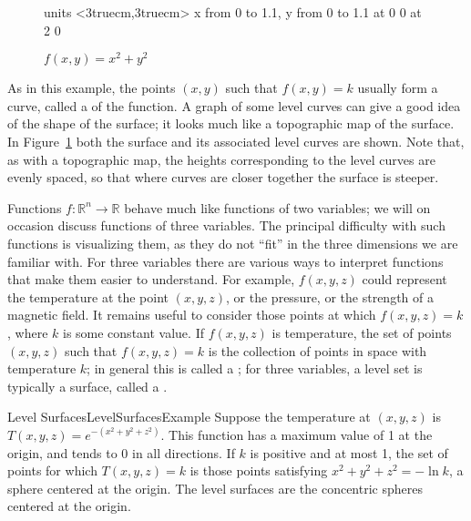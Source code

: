 \begin{figure}[H]
\centerline{
\vbox{\beginpicture
\normalgraphs
\setcoordinatesystem units <3truecm,3truecm>
\setplotarea x from 0 to 1.1, y from 0 to 1.1
 at 0 0
 at 2 0
\endpicture}}
\caption{$f(x,y)=x^2 + y^2$}
\label{fig:parabolic bowl}
\end{figure}

As in this example, the points $(x,y)$ such that $f(x,y)=k$ usually
form a curve, called a  of the
function. A graph of some level curves can give a good idea of the
shape of the surface; it looks much like a topographic map of the
surface. In Figure~\ref{fig:parabolic bowl} both the surface and
its associated level curves are shown. Note that, as with a
topographic map, the heights corresponding to the level curves are
evenly spaced, so that where curves are closer together the surface is
steeper.

Functions $f\colon\mathbb{R}^n\to\mathbb{R}$ behave much like functions of two
variables; we will on occasion discuss functions of three variables.
The principal difficulty with such functions is visualizing them, as
they do not ``fit'' in the three dimensions we are familiar with. For
three variables there are various ways to interpret functions that
make them easier to understand. For example, $f(x,y,z)$ could
represent the temperature at the point $(x,y,z)$, or the pressure, or
the strength of a magnetic field.  It remains useful to consider those
points at which $f(x,y,z)=k$, where $k$ is some constant value. If
$f(x,y,z)$ is temperature, the set of points $(x,y,z)$ such that
$f(x,y,z)=k$ is the collection of points in space with temperature $k$;
in general this is called a ; for
three variables, a level set is typically a surface, called a .

\begin{example}{Level Surfaces}{LevelSurfacesExample}
Suppose the temperature at $(x,y,z)$ is 
$T(x,y,z)=e^{-(x^2+y^2+z^2)}$. This function has a maximum value of 1
at the origin, and tends to 0 in all directions. If $k$ is positive
and at most 1,
the set of points for which $T(x,y,z)=k$ is those points satisfying
$x^2+y^2+z^2=-\ln k$, a sphere centered at the origin. The level
surfaces are the concentric spheres centered at the origin.
\end{example}


